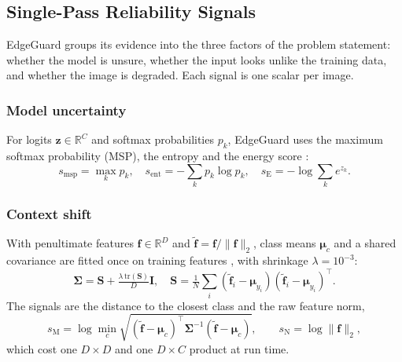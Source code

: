 \documentclass[conference]{IEEEtran}
\begin{document}
\subsection{Single-Pass Reliability Signals}

EdgeGuard groups its evidence into the three factors of the problem statement: whether the model is unsure, whether the input looks unlike the training data, and whether the image is degraded. Each signal is one scalar per image.

\subsubsection{Model uncertainty}
For logits $\mathbf{z}\in\mathbb{R}^{C}$ and softmax probabilities $p_k$, EdgeGuard uses the maximum softmax probability (MSP), the entropy and the energy score \cite{hendrycks2017baseline,liu2020energy}:
\begin{equation}
s_{\text{msp}}=\max_k p_k,\quad s_{\text{ent}}=-\sum_{k} p_k\log p_k,\quad s_{\text{E}}=-\log\sum_{k} e^{z_k}.
\label{eq:logit}
\end{equation}

\subsubsection{Context shift}
With penultimate features $\mathbf{f}\in\mathbb{R}^{D}$ and $\tilde{\mathbf{f}}=\mathbf{f}/\lVert\mathbf{f}\rVert_2$, class means $\boldsymbol{\mu}_c$ and a shared covariance are fitted once on training features \cite{lee2018mahalanobis}, with shrinkage $\lambda=10^{-3}$:
\begin{equation}
\boldsymbol{\Sigma}=\mathbf{S}+\tfrac{\lambda\,\mathrm{tr}(\mathbf{S})}{D}\mathbf{I},\quad \mathbf{S}=\tfrac{1}{N}\textstyle\sum_{i}(\tilde{\mathbf{f}}_i-\boldsymbol{\mu}_{y_i})(\tilde{\mathbf{f}}_i-\boldsymbol{\mu}_{y_i})^{\top}.
\label{eq:cov}
\end{equation}
The signals are the distance to the closest class and the raw feature norm,
\begin{equation}
s_{\text{M}}=\log\min_{c}\sqrt{(\tilde{\mathbf{f}}-\boldsymbol{\mu}_c)^{\top}\boldsymbol{\Sigma}^{-1}(\tilde{\mathbf{f}}-\boldsymbol{\mu}_c)},\qquad s_{\text{N}}=\log\lVert\mathbf{f}\rVert_2 ,
\label{eq:maha}
\end{equation}
which cost one $D\times D$ and one $D\times C$ product at run time.
\end{document}
